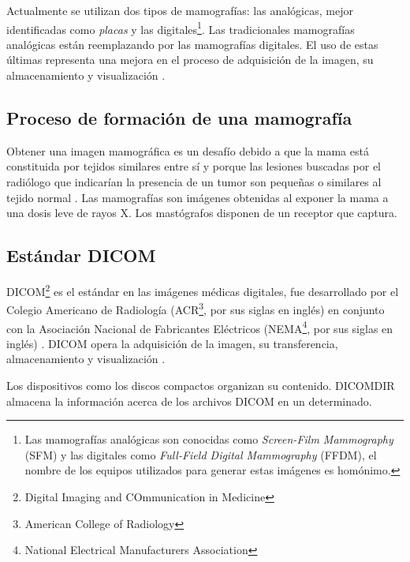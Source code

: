 Actualmente se utilizan dos tipos de mamografías: las analógicas, mejor
identificadas como \textit{placas} y las digitales\footnote{Las mamografías
analógicas son conocidas como \textit{Screen-Film Mammography} (SFM) y las
digitales como \textit{Full-Field Digital Mammography} (FFDM), el nombre de los
equipos utilizados para generar estas imágenes es homónimo.}. Las tradicionales
mamografías analógicas están reemplazando por las mamografías digitales. El uso
de estas últimas representa una mejora en el proceso de adquisición de la
imagen, su almacenamiento y visualización \cite{pisano2000current}. 

\subsection{Proceso de formación de una mamografía}

Obtener una imagen mamográfica es un desafío debido a que la mama está
constituida por tejidos similares entre sí y porque las lesiones buscadas por
el radiólogo que indicarían la presencia de un tumor son pequeñas o similares
al tejido normal \cite{mxcancer}. Las mamografías son imágenes obtenidas al
exponer la mama a una dosis leve de rayos X. Los mastógrafos disponen de un
receptor que captura.

\subsection{Estándar DICOM}

DICOM\footnote{Digital Imaging and COmmunication in Medicine} es el estándar en
las imágenes médicas digitales, fue desarrollado por el Colegio Americano de
Radiología (ACR\footnote{American College of Radiology}, por sus siglas en
inglés) en conjunto con la Asociación Nacional de Fabricantes Eléctricos
(NEMA\footnote{National Electrical Manufacturers Association}, por sus siglas
en inglés) \cite{national1996digital}. DICOM opera la adquisición de la imagen,
su transferencia, almacenamiento y visualización \cite{pianykh2011digital}.  

Los dispositivos como los discos compactos organizan su contenido. DICOMDIR
almacena la información acerca de los archivos DICOM en un determinado.




